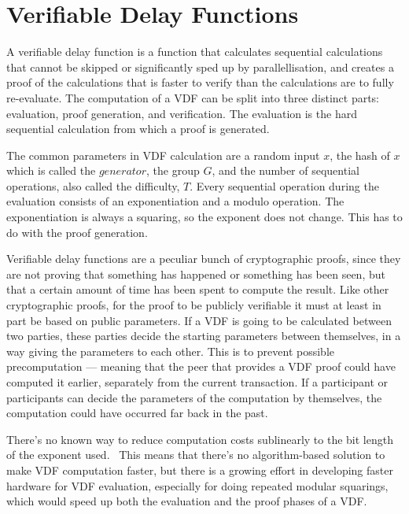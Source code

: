 \section{Verifiable Delay Functions}
\label{VDF}

A verifiable delay function is a function that calculates sequential calculations that cannot be skipped or significantly sped up by parallellisation, and creates a proof of the calculations that is faster to verify than the calculations are to fully re-evaluate. The computation of a VDF can be split into three distinct parts: evaluation, proof generation, and verification. The evaluation is the hard sequential calculation from which a proof is generated.~\cite{Boneh2018-sm}

The common parameters in VDF calculation are a random input \(x\), the hash of \(x\) which is called the \(generator\), the group \(G\), and the number of sequential operations, also called the difficulty, \(T\). Every sequential operation during the evaluation consists of an exponentiation and a modulo operation. The exponentiation is always a squaring, so the exponent does not change. This has to do with the proof generation.

Verifiable delay functions are a peculiar bunch of cryptographic proofs, since they are not proving that something has happened or something has been seen, but that a certain amount of time has been spent to compute the result. Like other cryptographic proofs, for the proof to be publicly verifiable it must at least in part be based on public parameters. If a VDF is going to be calculated between two parties, these parties decide the starting parameters between themselves, in a way giving the parameters to each other. This is to prevent possible precomputation --- meaning that the peer that provides a VDF proof could have computed it earlier, separately from the current transaction. If a participant or participants can decide the parameters of the computation by themselves, the computation could have occurred far back in the past.

There's no known way to reduce computation costs sublinearly to the bit length of the exponent used.~\cite{Boneh2018-sm} This means that there's no algorithm-based solution to make VDF computation faster, but there is a growing effort in developing faster hardware for VDF evaluation, especially for doing repeated modular squarings, which would speed up both the evaluation and the proof phases of a VDF.~\cite{noauthor_undated-jb, noauthor_undated-da, noauthor_2020-ki}

